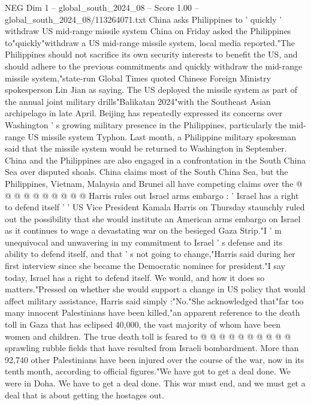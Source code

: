 \begin{textsample}{NEG Dim 1 – global\_south\_2024\_08 – Score 1.00 – global\_south\_2024\_08/113264071.txt}  \label{ex:f1_neg_438}
China asks Philippines to ' quickly ' withdraw US mid-range missile system China on Friday asked the Philippines to"quickly"withdraw a US mid-range missile system, local media reported."The Philippines should not sacrifice its own security interests to benefit the US, and should adhere to the previous commitments and quickly withdraw the mid-range missile system,"state-run Global Times quoted Chinese Foreign Ministry spokesperson Lin Jian as saying.
The US deployed the missile system as part of the annual joint military drills"Balikatan 2024"with the Southeast Asian archipelago in late April.
Beijing has repeatedly expressed its concerns over Washington ' s growing military presence in the Philippines, particularly the mid-range US missile system Typhon.
Last month, a Philippine military spokesman said that the missile system would be returned to Washington in September.
China and the Philippines are also engaged in a confrontation in the South China Sea over disputed shoals.
China claims most of the South China Sea, but the Philippines, Vietnam, Malaysia and Brunei all have competing claims over the @ @ @ @ @ @ @ @ @ @ Harris rules out Israel arms embargo : ' Israel has a right to defend itself ' ' US Vice President Kamala Harris on Thursday staunchly ruled out the possibility that she would institute an American arms embargo on Israel as it continues to wage a devastating war on the besieged Gaza Strip."I ' m unequivocal and unwavering in my commitment to Israel ' s defense and its ability to defend itself, and that ' s not going to change,"Harris said during her first interview since she became the Democratic nominee for president."I say today, Israel has a right to defend itself.
We would, and how it does so matters."Pressed on whether she would support a change in US policy that would affect military assistance, Harris said simply :"No."She acknowledged that"far too many innocent Palestinians have been killed,"an apparent reference to the death toll in Gaza that has eclipsed 40,000, the vast majority of whom have been women and children.
The true death toll is feared to @ @ @ @ @ @ @ @ @ @ sprawling rubble fields that have resulted from Israeli bombardment.
More than 92,740 other Palestinians have been injured over the course of the war, now in its tenth month, according to official figures."We have got to get a deal done.
We were in Doha.
We have to get a deal done.
This war must end, and we must get a deal that is about getting the hostages out.

\end{textsample}
